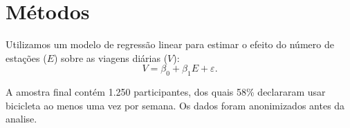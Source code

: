 \section{Métodos}
\label{sec:metodos}

Utilizamos um modelo de regressão linear para estimar o efeito do número de estações ($E$) sobre as viagens diárias ($V$):
\begin{equation}
  V = \beta_0 + \beta_1 E + \varepsilon .
\end{equation}

A amostra final contém 1.250 participantes, dos quais 58\% declararam usar bicicleta ao menos uma vez por semana. Os dados foram anonimizados antes da analise.
